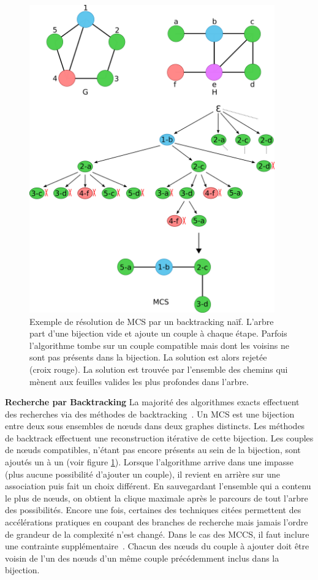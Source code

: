 \begin{figure}[!ht]
  \begin{center}
    \includegraphics[width=400px]{Figures/s2m/MCS-SI/backtracking_solve.png}
    \caption{\label{backtracking_solve}Exemple de résolution de MCS par un backtracking naïf.
    L'arbre part d'une bijection vide et ajoute un couple à chaque étape.
    Parfois l'algorithme tombe sur un couple compatible mais dont les voisins ne sont pas présents dans la bijection.
    La solution est alors rejetée (croix rouge).
    La solution est trouvée par l'ensemble des chemins qui mènent aux feuilles valides les plus profondes dans l'arbre.}
  \end{center}
\end{figure}


\textbf{Recherche par Backtracking}
La majorité des algorithmes exacts effectuent des recherches via des méthodes de backtracking~\cite{manic_branch&cut_2009,mcgregor_backtrack_1982,kawabata_build-up_2011}.
Un MCS est une bijection entre deux sous ensembles de n\oe{}uds dans deux graphes distincts.
Les méthodes de backtrack effectuent une reconstruction itérative de cette bijection.
Les couples de n\oe{}uds compatibles, n'étant pas encore présents au sein de la bijection, sont ajoutés un à un (voir figure \ref{backtracking_solve}).
Lorsque l'algorithme arrive dans une impasse (plus aucune possibilité d'ajouter un couple), il revient en arrière sur une association puis fait un choix différent.
En sauvegardant l'ensemble qui a contenu le plus de n\oe{}uds, on obtient la clique maximale après le parcours de tout l'arbre des possibilités.
Encore une fois, certaines des techniques citées permettent des accélérations pratiques en coupant des branches de recherche mais jamais l'ordre de grandeur de la complexité n'est changé.
Dans le cas des MCCS, il faut inclure une contrainte supplémentaire~\cite{chang_moderately_2014}.
Chacun des n\oe{}uds du couple à ajouter doit être voisin de l'un des n\oe{}uds d'un même couple précédemment inclus dans la bijection.

